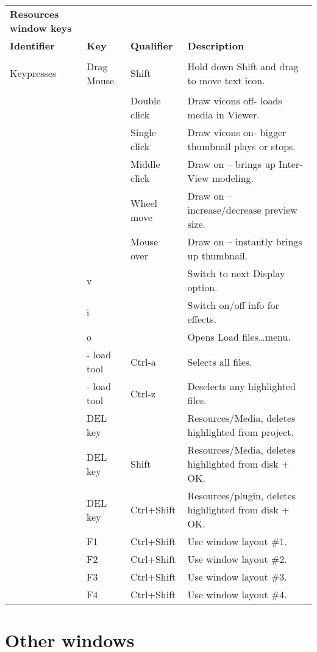 \begin{longtable}[h]{>{\bfseries}p{}p{}p{}p{}}
  \toprule
  \multicolumn{4}{c}%
  {\textcolor{CinRed}{\textbf{Resources window keys}}} \\
  Identifier & \textbf{Key} & \textbf{Qualifier} & \textbf{Description}\\
  \midrule
  \endhead

  \textcolor{CinBlueText}{Keypresses} & Drag Mouse & Shift & Hold down Shift and drag to move text icon. \\
  &  & Double click & Draw vicons off- loads media in Viewer. \\
  &  & Single click & Draw vicons on- bigger thumbnail plays or stops. \\
  &  & Middle click & Draw on -- brings up Inter-View modeling. \\
  &  & Wheel move & Draw on – increase/decrease preview size. \\
  &  & Mouse over & Draw on – instantly brings up thumbnail. \\
  & v &  & Switch to next Display option. \\
  & i &  & Switch on/off info for effects. \\
  & o &  & Opens Load files\dots menu. \\
  & - load tool & Ctrl-a & Selects all files. \\
  & - load tool & Ctrl-z & Deselects any highlighted files. \\
  & DEL key &  & Resources/Media, deletes highlighted from project. \\
  & DEL key & Shift & Resources/Media, deletes highlighted from disk + OK. \\
  & DEL key & Ctrl+Shift & Resources/plugin, deletes highlighted from disk + OK. \\
  & F1 & Ctrl+Shift & Use window layout \#1. \\
  & F2 & Ctrl+Shift & Use window layout \#2. \\
  & F3 & Ctrl+Shift & Use window layout \#3. \\
  & F4 & Ctrl+Shift & Use window layout \#4. \\
  \bottomrule
\end{longtable}


\section{Other windows }%
\label{sec:other_windows}

